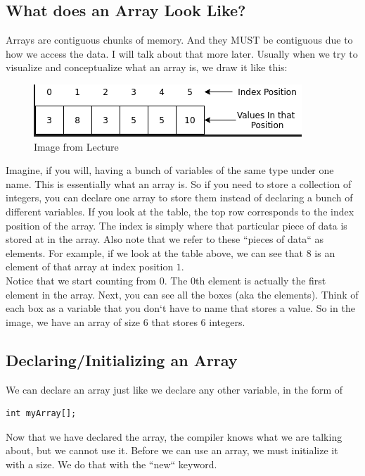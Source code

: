 \documentclass[11]{article}
\begin{document}
\subsection{What does an Array Look Like?}
Arrays are contiguous chunks of memory. And they MUST be contiguous due to how we access the data. I will talk about that more later. Usually when we try to visualize and conceptualize what an array is, we draw it like this:\\

\begin{figure}[H]
	\centering
	\includegraphics[scale=0.5]{arrays1.png}
	\caption{Image from Lecture}
\end{figure}

Imagine, if you will, having a bunch of variables of the same type under one name. This is essentially what an array is. So if you need to store a collection of integers, you can declare one array to store them instead of declaring a bunch of different variables. If you look at the table, the top row corresponds to the index position of the array. The index is simply where that particular piece of data is stored at in the array. Also note that we refer to these ``pieces of data`` as elements. For example, if we look at the table above, we can see that $8$ is an element of that array at index position $1$. \\

Notice that we start counting from $0$. The $0$th element is actually the first element in the array. Next, you can see all the boxes (aka the elements). Think of each box as a variable that you don`t have to name that stores a value. So in the image, we have an array of size $6$ that stores $6$ integers.\\

\subsection{Declaring/Initializing an Array}
We can declare an array just like we declare any other variable, in the form of
\begin{lstlisting}
int myArray[];
\end{lstlisting}
Now that we have declared the array, the compiler knows what we are talking about, but we cannot use it. Before we can use an array, we must initialize it with a size. We do that with the ``new`` keyword.
\end{document}
